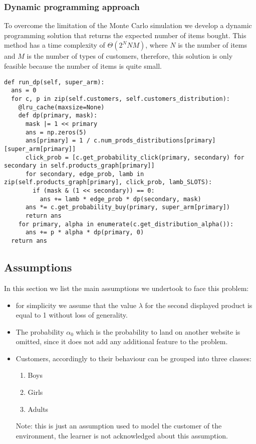 \subsubsection{Dynamic programming approach}
To overcome the limitation of the Monte Carlo simulation we develop a dynamic programming solution that returns the expected number of items bought. This method has a time complexity of \(\Theta(2^{N}NM)\), where \(N\) is the number of items and \(M\) is the number of types of customers, therefore, this solution is only feasible because the number of items is quite small.
\begin{verbatim}
def run_dp(self, super_arm):
  ans = 0
  for c, p in zip(self.customers, self.customers_distribution):
    @lru_cache(maxsize=None)
    def dp(primary, mask):
      mask |= 1 << primary
      ans = np.zeros(5)
      ans[primary] = 1 / c.num_prods_distributions[primary][super_arm[primary]]
      click_prob = [c.get_probability_click(primary, secondary) for secondary in self.products_graph[primary]]
      for secondary, edge_prob, lamb in zip(self.products_graph[primary], click_prob, lamb_SLOTS):
        if (mask & (1 << secondary)) == 0:
          ans += lamb * edge_prob * dp(secondary, mask)
      ans *= c.get_probability_buy(primary, super_arm[primary])
      return ans
    for primary, alpha in enumerate(c.get_distribution_alpha()):
      ans += p * alpha * dp(primary, 0)
  return ans
\end{verbatim}
\subsection{Assumptions}
In this section we list the main assumptions we undertook to face this problem:
\begin{itemize}
    \item for simplicity we assume that the value $\lambda$ for the second displayed product is equal to 1 without loss of generality.
    \item The probability $\alpha_0$ which is the probability to land on another website is omitted, since it does not add any additional feature to the problem.
    \item Customers, accordingly to their behaviour can be grouped into three classes:
    \begin{enumerate}
        \item Boys
        \item Girls
        \item Adults
    \end{enumerate}
    Note: this is just an assumption used to model the customer of the environment, the learner is not acknowledged about this assumption.
\end{itemize}
